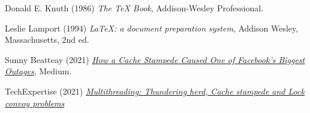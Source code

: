 \documentclass{article}
\begin{document}
\begin{thebibliography}{9}
Donald E. Knuth (1986) \emph{The \TeX{} Book}, Addison-Wesley Professional.

Leslie Lamport (1994) \emph{\LaTeX: a document preparation system}, Addison
Wesley, Massachusetts, 2nd ed.

Sunny Beatteay (2021) \emph{\href{https://betterprogramming.pub/how-a-cache-stampede-caused-one-of-facebooks-biggest-outages-dbb964ffc8ed}{How a Cache Stampede Caused One of Facebook’s Biggest Outages}}, Medium. 

TechExpertise (2021) \emph{\href{https://serantechexplore.wixsite.com/website/post/multithreading-thundering-herd-cache-stampede-and-lock-convoy-problems}{Multithreading: Thundering herd, Cache stampede and Lock convoy problems}}
\end{thebibliography}
\end{document}
